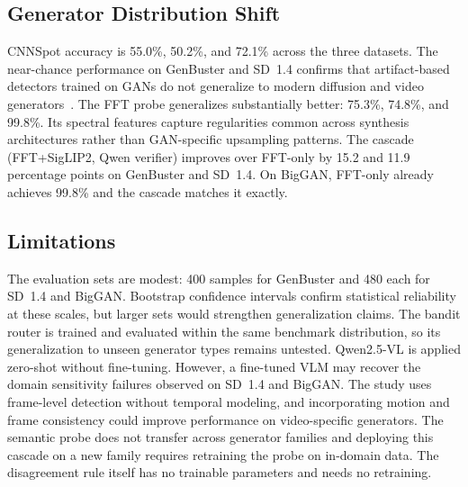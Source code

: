 \documentclass{ieeeaccess}
\begin{document}
\subsection{Generator Distribution Shift}

CNNSpot accuracy is 55.0\%, 50.2\%, and 72.1\% across the three datasets. The
near-chance performance on GenBuster and SD~1.4 confirms that artifact-based detectors
trained on GANs do not generalize to modern diffusion and video
generators~\cite{Wang_2023_ICCV}. The FFT probe generalizes substantially better:
75.3\%, 74.8\%, and 99.8\%. Its spectral features capture regularities common across
synthesis architectures rather than GAN-specific upsampling patterns. The cascade
(FFT+SigLIP2, Qwen verifier) improves over FFT-only by 15.2 and 11.9 percentage
points on GenBuster and SD~1.4. On BigGAN, FFT-only already achieves 99.8\% and the
cascade matches it exactly.




\subsection{Limitations}

The evaluation sets are modest: 400 samples for GenBuster and 480 each for SD~1.4
and BigGAN. Bootstrap confidence intervals confirm statistical reliability at these
scales, but larger sets would strengthen generalization claims. The bandit router is
trained and evaluated within the same benchmark distribution, so its generalization
to unseen generator types remains untested. Qwen2.5-VL is applied zero-shot without
fine-tuning. However, a fine-tuned VLM may recover the domain sensitivity failures observed on
SD~1.4 and BigGAN. The study uses frame-level detection without temporal modeling,
and incorporating motion and frame consistency could improve performance on
video-specific generators. The semantic probe does not transfer across generator
families and deploying this cascade on a new family requires retraining the probe on
in-domain data. The disagreement rule itself has no trainable parameters and needs
no retraining.
\end{document}
